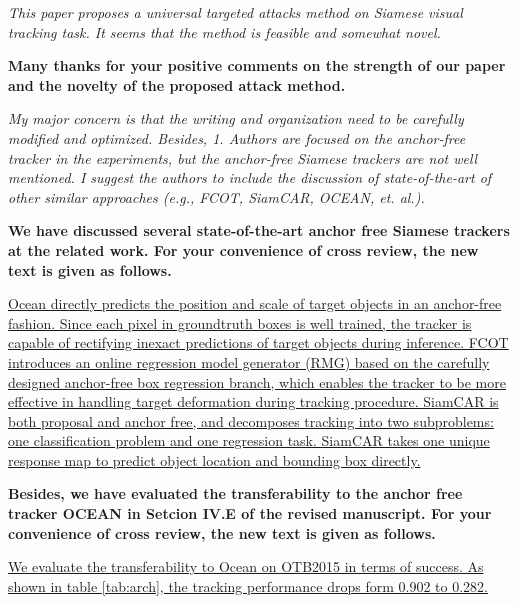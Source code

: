 \documentclass[12pt]{article}
\begin{document}
\newpage
\textit{This paper proposes a universal targeted attacks method on Siamese visual tracking task. It seems that the method is feasible and somewhat novel.}

\textbf{Many thanks for your positive comments on the strength of our paper and the novelty of the proposed attack method.}

\textit{My major concern is that the writing and organization need to be carefully modified and optimized. Besides, 1. Authors are focused on the anchor-free tracker in the experiments, but the anchor-free Siamese trackers are not well mentioned. I suggest the authors to include the discussion of state-of-the-art of other similar approaches (e.g., FCOT, SiamCAR, OCEAN, et. al.).}

\textbf{We have discussed several state-of-the-art anchor free Siamese trackers at the related work. For your convenience of cross review, the new text is given as follows.}

\uline{
Ocean \cite{zhang2020ocean} directly predicts the position and scale of target objects in an anchor-free fashion. Since each pixel in groundtruth boxes is well trained, the tracker is capable of rectifying inexact predictions of target objects during inference.
FCOT \cite{cui2020fully} introduces an online regression model generator (RMG) based on the carefully designed anchor-free box regression branch, which enables the tracker to be more effective in handling target deformation during tracking procedure.
SiamCAR \cite{9157720} is both proposal and anchor free, and decomposes tracking into two subproblems: one classification problem and one regression task. SiamCAR takes one unique response map to predict object location and bounding box directly.
}

\textbf{Besides, we have evaluated the transferability to the anchor free tracker OCEAN in Setcion IV.E of the revised manuscript. For your convenience of cross review, the new text is given as follows.}

\uline{We evaluate the transferability to Ocean on OTB2015 in terms of success. As shown in table \ref{tab:arch}, the tracking performance drops form 0.902 to 0.282.}
\end{document}

